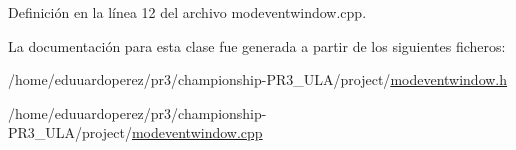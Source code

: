 Definición en la línea 12 del archivo modeventwindow.\+cpp.



La documentación para esta clase fue generada a partir de los siguientes ficheros\+:\begin{DoxyCompactItemize}
\item 
/home/eduuardoperez/pr3/championship-\/\+P\+R3\+\_\+\+U\+L\+A/project/\hyperlink{modeventwindow_8h}{modeventwindow.\+h}\item 
/home/eduuardoperez/pr3/championship-\/\+P\+R3\+\_\+\+U\+L\+A/project/\hyperlink{modeventwindow_8cpp}{modeventwindow.\+cpp}\end{DoxyCompactItemize}
